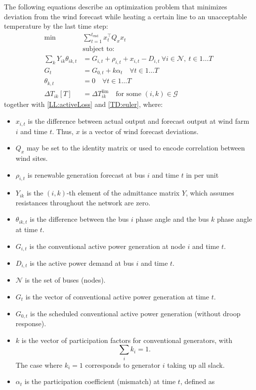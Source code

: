 \documentclass[conference]{IEEEtran}
\begin{document}
The following equations describe an optimization problem that minimizes deviation from the wind forecast while heating a certain line to an unacceptable temperature by the last time step:
\begin{subequations}\label{I:all}
\begin{align}
\label{I:obj}\min & \sum_{t=1}^{t_\text{end}} x_t^\top Q_x x_t \\
\nonumber& \text{subject to:} \\
\label{I:flow} \sum_k Y_{ik} \theta_{ik,t} & = G_{i,t} + \rho_{i,t} + x_{i,t} - D_{i,t} ~ \forall i \in \mathcal{N},~t\in 1... T \\
\label{I:conv} G_t &= G_{0,t} + k\alpha_t \quad \forall t\in 1\ldots T \\
\label{I:slack} \theta_{k,t} & = 0 \quad \forall t\in 1\ldots T \\
\label{I:lim} \Delta T_{ik}[T] &= \Delta T_{ik}^\text{lim}\quad \text{for some }(i,k)\in \mathcal{G}
\end{align}
\end{subequations}
together with \eqref{LL:activeLoss} and \eqref{TD:euler}, where:
\begin{itemize}
\itemsep1pt\parskip0pt
\item $x_{i,t}$ is the difference between actual output and forecast output at wind farm $i$ and time $t$. Thus, $x$ is a vector of wind forecast deviations.
\item $Q_x$ may be set to the identity matrix or used to encode correlation between wind sites.
\item $\rho_{i,t}$ is renewable generation forecast at bus $i$ and time $t$ in per unit 
\item $Y_{ik}$ is the $(i,k)$-th element of the admittance matrix $Y$, which
  assumes resistances throughout the network are zero.
\item $\theta_{ik,t}$ is the difference between the bus $i$ phase angle and the bus $k$ phase angle at time $t$.
\item $G_{i,t}$ is the conventional active power generation at node $i$ and time $t$.
\item $D_{i,t}$ is the active power demand at bus $i$ and time $t$.
\item $\mathcal{N}$ is the set of buses (nodes).
\item $G_t$ is the vector of conventional active power generation at time $t$.
\item $G_{0,t}$ is the scheduled conventional active power generation (without droop response).
\item $k$ is the vector of participation factors for conventional
  generators, with
\begin{equation}
\label{I:part} \sum_i k_i = 1.
\end{equation}
The case where $k_i=1$ corresponds to generator $i$ taking up all
  slack.
\item $\alpha_t$ is the participation coefficient (mismatch) at time $t$, defined as
\end{itemize}
\end{document}
